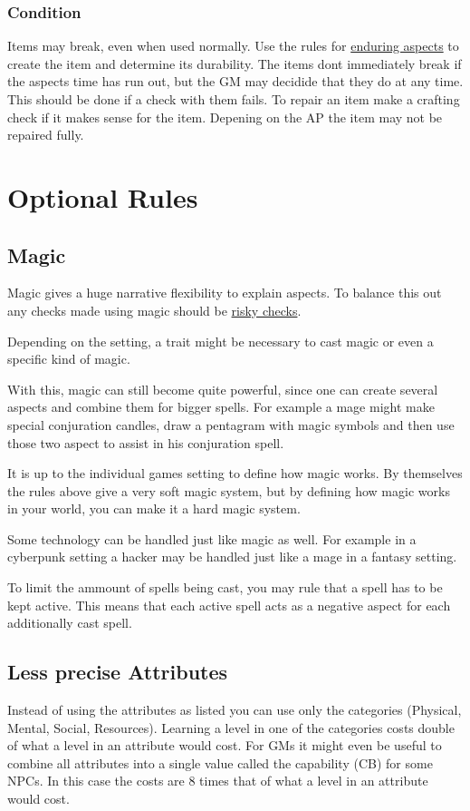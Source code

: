 \documentclass[11pt]{article}
\begin{document}
{\subsubsection{Condition}
\label{sec:org5867cbd}
Items may break, even when used normally. Use the rules for \hyperref[sec:orgdf4d4d8]{enduring aspects} to create the item and determine its durability. The items dont immediately break if the aspects time has run out, but the GM may decidide that they do at any time. This should be done if a check with them fails. To repair an item make a crafting check if it makes sense for the item. Depening on the AP the item may not be repaired fully.
\section{Optional Rules}
\label{sec:org982a613}
\subsection{Magic}
\label{sec:org838bc3c}

Magic gives a huge narrative flexibility to explain aspects. To balance this out any checks made using magic should be \hyperref[sec:org46016d5]{risky checks}.

Depending on the setting, a trait might be necessary to cast magic or even a specific kind of magic.

With this, magic can still become quite powerful, since one can create several aspects and combine them for bigger spells. For example a mage might make special conjuration candles, draw a pentagram with magic symbols and then use those two aspect to assist in his conjuration spell.

It is up to the individual games setting to define how magic works. By themselves the rules above give a very soft magic system, but by defining how magic works in your world, you can make it a hard magic system.

Some technology can be handled just like magic as well. For example in a cyberpunk setting a hacker may be handled just like a mage in a fantasy setting.

To limit the ammount of spells being cast, you may rule that a spell has to be kept active. This means that each active spell acts as a negative aspect for each additionally cast spell. 
\subsection{Less precise Attributes}
\label{sec:org4e3cb3f}
Instead of using the attributes as listed you can use only the categories (Physical, Mental, Social, Resources). Learning a level in one of the categories costs double of what a level in an attribute would cost.
For GMs it might even be useful to combine all attributes into a single value called the capability (CB) for some NPCs. In this case the costs are 8 times that of what a level in an attribute would cost.
}
\end{document}
